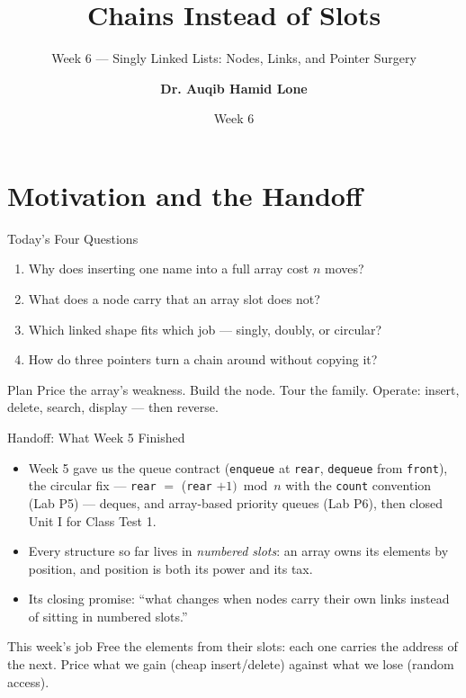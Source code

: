 \documentclass[aspectratio=169]{beamer}
\title{Chains Instead of Slots}
\subtitle{Week 6 --- Singly Linked Lists: Nodes, Links, and Pointer Surgery}
\author[Dr. Auqib Hamid Lone]{\textbf{Dr. Auqib Hamid Lone}}
\institute[GCET Ganderbal]{PCC CS-301: Data Structures\\GCET, Ganderbal}
\date[Week 6]{\small Week 6}
\begin{document}
\frame{\titlepage}

\section{Motivation and the Handoff}

\begin{frame}{Today's Four Questions}
  \begin{enumerate}
    \item Why does inserting one name into a full array cost $n$ moves?
    \item What does a node carry that an array slot does not?
    \item Which linked shape fits which job --- singly, doubly, or circular?
    \item How do three pointers turn a chain around without copying it?
  \end{enumerate}
  \vspace{0.2cm}
  \begin{exampleblock}{Plan}
    Price the array's weakness. Build the node. Tour the family. Operate:
    insert, delete, search, display --- then reverse.
  \end{exampleblock}
\end{frame}

\begin{frame}{Handoff: What Week 5 Finished}
  \begin{itemize}
    \item Week 5 gave us the queue contract (\texttt{enqueue} at
      \texttt{rear}, \texttt{dequeue} from \texttt{front}), the circular fix
      --- \texttt{rear} $=$ (\texttt{rear} $+ 1) \bmod n$ with the
      \texttt{count} convention (Lab P5) --- deques, and array-based priority
      queues (Lab P6), then closed Unit I for Class Test 1.
    \item Every structure so far lives in \emph{numbered slots}: an array owns
      its elements by position, and position is both its power and its tax.
    \item Its closing promise: ``what changes when nodes carry their own
      links instead of sitting in numbered slots.''
  \end{itemize}
  \begin{exampleblock}{This week's job}
    Free the elements from their slots: each one carries the address of the
    next. Price what we gain (cheap insert/delete) against what we lose
    (random access).
  \end{exampleblock}
\end{frame}
\end{document}
